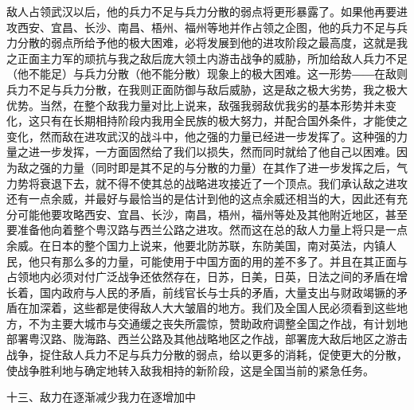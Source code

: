 敌人占领武汉以后，他的兵力不足与兵力分散的弱点将更形暴露了。如果他再要进攻西安、宜昌、长沙、南昌、梧州、福州等地并作占领之企图，他的兵力不足与兵力分散的弱点所给予他的极大困难，必将发展到他的进攻阶段之最高度，这就是我之正面主力军的顽抗与我之敌后庞大领土内游击战争的威胁，所加给敌人兵力不足（他不能足）与兵力分散（他不能分散）现象上的极大困难。这一形势――在敌则兵力不足与兵力分散，在我则正面防御与敌后威胁，这是敌之极大劣势，我之极大优势。当然，在整个敌我力量对比上说来，敌强我弱敌优我劣的基本形势并未变化，这只有在长期相持阶段内我用全民族的极大努力，并配合国外条件，才能使之变化，然而敌在进攻武汉的战斗中，他之强的力量已经进一步发挥了。这种强的力量之进一步发挥，一方面固然给了我们以损失，然而同时就给了他自己以困难。因为敌之强的力量（同时即是其不足的与分散的力量）在其作了进一步发挥之后，气力势将衰退下去，就不得不使其总的战略进攻接近了一个顶点。我们承认敌之进攻还有一点余威，并最好与最恰当的是估计到他的这点余威还相当的大，因此还有充分可能他要攻略西安、宜昌、长沙，南昌，梧州，福州等处及其他附近地区，甚至要准备他向着整个粤汉路与西兰公路之进攻。然而这在总的敌人力量上将只是一点余威。在日本的整个国力上说来，他要北防苏联，东防美国，南对英法，内镇人民，他只有那么多的力量，可能使用于中国方面的用的差不多了。并且在其正面与占领地内必须对付广泛战争还依然存在，日苏，日美，日英，日法之间的矛盾在增长着，国内政府与人民的矛盾，前线官长与士兵的矛盾，大量支出与财政竭镢的矛盾在加深着，这些都是使得敌人大大皱眉的地方。我们及全国人民必须看到这些地方，不为主要大城市与交通缓之丧失所震惊，赞助政府调整全国之作战，有计划地部署粤汉路、陇海路、西兰公路及其他战略地区之作战，部署庞大敌后地区之游击战争，捉住敌人兵力不足与兵力分散的弱点，给以更多的消耗，促使更大的分散，使战争胜利地与确定地转入敌我相持的新阶段，这是全国当前的紧急任务。

十三、敌力在逐渐减少我力在逐增加中

